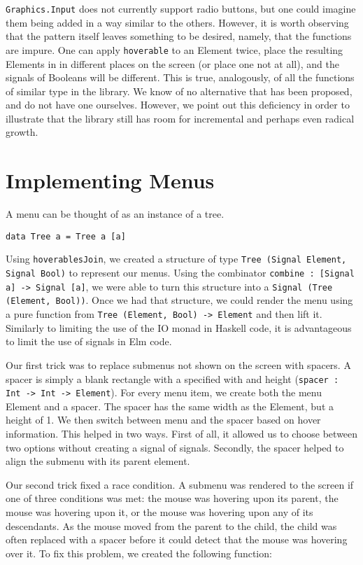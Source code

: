 \documentclass{article}
\begin{document}
\texttt{Graphics.Input} does not currently support radio buttons, but one could
imagine them being added in a way similar to the others. However, it is worth
observing that the pattern itself leaves something to be desired, namely, that
the functions are impure. One can apply \texttt{hoverable} to an Element twice,
place the resulting Elements in in different places on the screen (or place one
not at all), and the signals of Booleans will be different. This is true,
analogously, of all the functions of similar type in the library. We know of no
alternative that has been proposed, and do not have one ourselves. However, we
point out this deficiency in order to illustrate that the library still has room
for incremental and perhaps even radical growth.

\section{Implementing Menus}\label{implementing-menus}

A menu can be thought of as an instance of a tree.

\texttt{data Tree a = Tree a [a]}

Using \texttt{hoverablesJoin}, we created a structure of type
\texttt{Tree (Signal Element, Signal Bool)} to represent our menus.
Using the combinator
\texttt{combine : {[}Signal a{]} -\textgreater{} Signal {[}a{]}}, we
were able to turn this structure into a
\texttt{Signal (Tree (Element, Bool))}. Once we had that structure, we
could render the menu using a pure function from
\texttt{Tree (Element, Bool) -\textgreater{} Element} and then lift it.
Similarly to limiting the use of the IO monad in Haskell code, it is
advantageous to limit the use of signals in Elm code.

Our first trick was to replace submenus not shown on the screen with
spacers. A spacer is simply a blank rectangle with a specified with and
height
(\texttt{spacer : Int -\textgreater{} Int -\textgreater{} Element}). For
every menu item, we create both the menu Element and a spacer. The
spacer has the same width as the Element, but a height of 1. We then
switch between menu and the spacer based on hover information. This
helped in two ways. First of all, it allowed us to choose between two
options without creating a signal of signals. Secondly, the spacer
helped to align the submenu with its parent element.

Our second trick fixed a race condition. A submenu was rendered to the
screen if one of three conditions was met: the mouse was hovering upon
its parent, the mouse was hovering upon it, or the mouse was hovering
upon any of its descendants. As the mouse moved from the parent to the
child, the child was often replaced with a spacer before it could detect
that the mouse was hovering over it. To fix this problem, we created the
following function:
\end{document}
